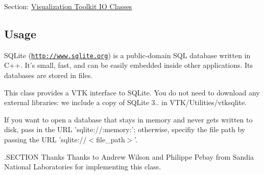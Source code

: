 Section\-: \hyperlink{sec_vtkio}{Visualization Toolkit I\-O Classes} \hypertarget{vtkwidgets_vtkxyplotwidget_Usage}{}\subsection{Usage}\label{vtkwidgets_vtkxyplotwidget_Usage}
S\-Q\-Lite (\href{http://www.sqlite.org}{\tt http\-://www.\-sqlite.\-org}) is a public-\/domain S\-Q\-L database written in C++. It's small, fast, and can be easily embedded inside other applications. Its databases are stored in files.

This class provides a V\-T\-K interface to S\-Q\-Lite. You do not need to download any external libraries\-: we include a copy of S\-Q\-Lite 3.. in V\-T\-K/\-Utilities/vtksqlite.

If you want to open a database that stays in memory and never gets written to disk, pass in the U\-R\-L 'sqlite\-://\-:memory\-:'; otherwise, specifiy the file path by passing the U\-R\-L 'sqlite\-://$<$file\-\_\-path$>$'.

.S\-E\-C\-T\-I\-O\-N Thanks Thanks to Andrew Wilson and Philippe Pebay from Sandia National Laboratories for implementing this class.

